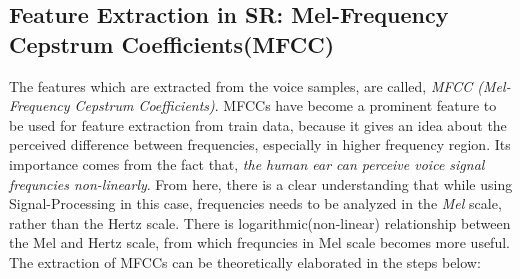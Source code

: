 \documentclass{article}
\begin{document}
\subsection{Feature Extraction in SR: Mel-Frequency Cepstrum Coefficients(MFCC)}
The features which are extracted from the voice samples, are called, \textit{MFCC (Mel-Frequency Cepstrum Coefficients)}. MFCCs have become a prominent feature to be used for feature extraction from train data, because it gives an idea about the perceived difference between frequencies, especially in higher frequency region. Its importance comes from the fact that, \textit{the human ear can perceive voice signal frequncies non-linearly}. From here, there is a clear understanding that while using Signal-Processing in this case, frequencies needs to be analyzed in the \textit{Mel} scale, rather than the {Hertz} scale. There is logarithmic(non-linear) relationship between the Mel and Hertz scale, from which frequncies in Mel scale becomes more useful. The extraction of MFCCs can be theoretically elaborated in the steps below:
\end{document}
